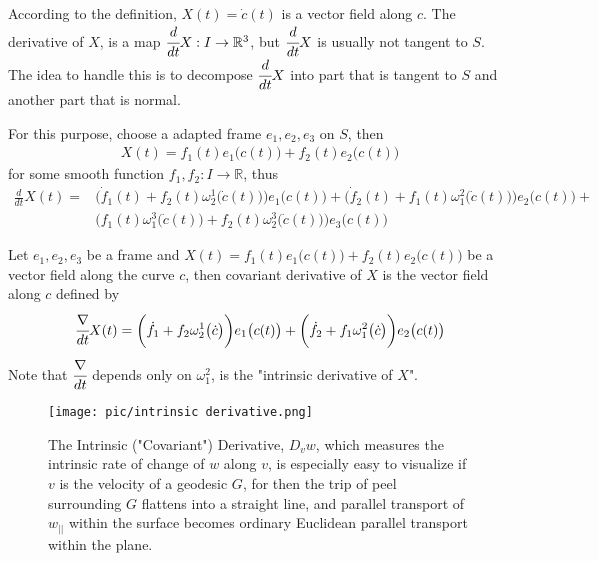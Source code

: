 \documentclass[10pt]{article}
\begin{document}
            According to the definition, $X(t) = \dot{c}(t)$ is a vector field along $c$. The derivative of $X$, is a map $\cfrac{d}{dt}X: I\rightarrow\mathbb{R}^3$, but $\cfrac{d}{dt}X$ is usually not tangent to $S$. The idea to handle this is to decompose $\cfrac{d}{dt}X$ into part that is tangent to $S$ and another part that is normal.

            For this purpose, choose a adapted frame $e_1, e_2, e_3$ on $S$, then
            \begin{equation*}
                \begin{aligned}
                    X(t) = f_1(t)e_1\big(c(t)\big) + f_2(t)e_2\big(c(t)\big)
                \end{aligned}
            \end{equation*}
            for some smooth function $f_1, f_2: I\rightarrow\mathbb{R}$, thus
            \begin{equation*}
                \begin{aligned}
                    \frac{d}{dt}X(t) = &\bigg( \dot{f}_1(t) + f_2(t)\omega_2^1\big(\dot{c}(t)\big) \bigg)e_1\big(c(t)\big) + \bigg( \dot{f}_2(t) + f_1(t)\omega_1^2\big(\dot{c}(t)\big) \bigg)e_2\big(c(t)\big) + \\ 
                    &\bigg( f_1(t)\omega_1^3\big(\dot{c}(t)\big) + f_2(t)\omega_2^3\big(\dot{c}(t)\big) \bigg)e_3\big(c(t)\big)
                \end{aligned}
            \end{equation*}

            \begin{definition}
                Let $e_1, e_2, e_3$ be a frame and $X(t) = f_1(t)e_1\big(c(t)\big) + f_2(t)e_2\big(c(t)\big)$ be a vector field along the curve $c$, then covariant derivative of $X$ is the vector field along $c$ defined by
                \begin{equation*}
                    \begin{aligned}
                        \cfrac{\nabla}{dt}X(t) = \bigg( \dot{f}_1 + f_2\omega_2^1\big(\dot{c}\big) \bigg)e_1\big(c(t)\big) + \bigg( \dot{f}_2 + f_1\omega_1^2\big(\dot{c}\big) \bigg)e_2\big(c(t)\big) 
                    \end{aligned}
                \end{equation*}
                Note that $\cfrac{\nabla}{dt}$ depends only on $\omega_1^2$, is the "intrinsic derivative of $X$".
            \end{definition}
            \begin{figure}[H]
                \centering
                \texttt{[image: pic/intrinsic derivative.png]}
                \caption{The Intrinsic ("Covariant") Derivative, $D_vw$, which measures the intrinsic rate of change of $w$ along $v$, is especially easy to visualize if $v$ is the velocity of a geodesic $G$, for then the trip of peel surrounding $G$ flattens into a straight line, and parallel transport of $w_{||}$ within the surface becomes ordinary Euclidean parallel transport within the plane.}
            \end{figure}
\end{document}
